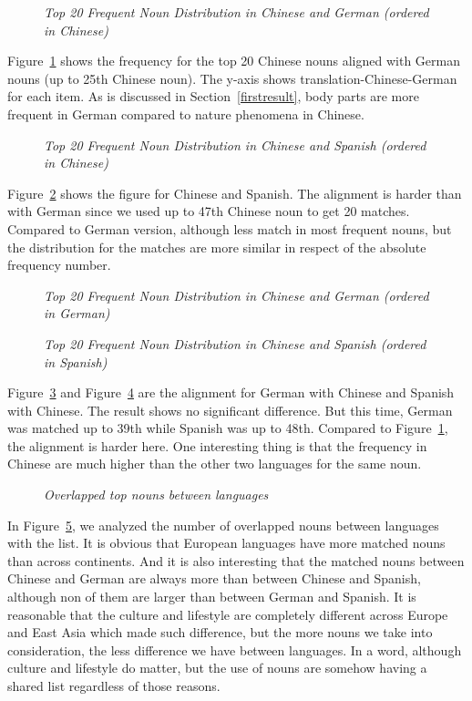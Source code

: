 \begin{figure}[t]
\centerline{}
\caption{{\it Top 20 Frequent Noun Distribution in Chinese and German (ordered in Chinese)}}
\label{fig1}
\end{figure}

Figure~\ref{fig1} shows the frequency for the top 20 Chinese nouns aligned with German nouns (up to 25th Chinese noun). The y-axis shows translation-Chinese-German for each item. As is discussed in Section~\ref{firstresult}, body parts are more frequent in German compared to nature phenomena in Chinese. 

\begin{figure}[t]
\centerline{}
\caption{{\it Top 20 Frequent Noun Distribution in Chinese and Spanish (ordered in Chinese)}}
\label{fig2}
\end{figure}

Figure~\ref{fig2} shows the figure for Chinese and Spanish. The alignment is harder than with German since we used up to 47th Chinese noun to get 20 matches. Compared to German version, although less match in most frequent nouns, but the distribution for the matches are more similar in respect of the absolute frequency number. 

\begin{figure}[t]
\centerline{}
\caption{{\it Top 20 Frequent Noun Distribution in Chinese and German (ordered in German)}}
\label{fig3}
\end{figure}

\begin{figure}[t]
\centerline{}
\caption{{\it Top 20 Frequent Noun Distribution in Chinese and Spanish (ordered in Spanish)}}
\label{fig4}
\end{figure}

Figure~\ref{fig3} and Figure~\ref{fig4} are the alignment for German with Chinese and Spanish with Chinese. The result shows no significant difference. But this time, German was matched up to 39th while Spanish was up to 48th. Compared to Figure~\ref{fig1}, the alignment is harder here. One interesting thing is that the frequency in Chinese are much higher than the other two languages for the same noun. 

\begin{figure}[t]
\centerline{}
\caption{{\it Overlapped top nouns between languages}}
\label{fig5}
\end{figure}

In Figure~\ref{fig5}, we analyzed the number of overlapped nouns between languages with the list. It is obvious that European languages have more matched nouns than across continents. And it is also interesting that the matched nouns between Chinese and German are always more than between Chinese and Spanish, although non of them are larger than between German and Spanish. It is reasonable that the culture and lifestyle are completely different across Europe and East Asia which made such difference, but the more nouns we take into consideration, the less difference we have between languages. In a word, although culture and lifestyle do matter, but the use of nouns are somehow having a shared list regardless of those reasons. 